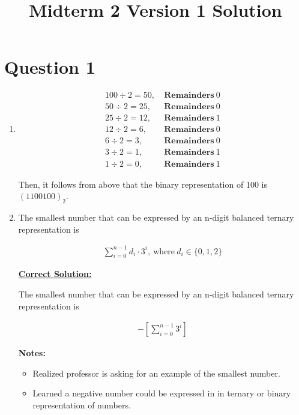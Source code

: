 \documentclass[12pt]{article}
\begin{document}
\title{Midterm 2 Version 1 Solution}
\maketitle

\section*{Question 1}
\begin{enumerate}
    \item

    \begin{align*}
        100 \div 2 = 50,\:&\textbf{Remainders}\:0\\
        50 \div 2 = 25,\:&\textbf{Remainders}\:0\\
        25 \div 2 = 12,\:&\textbf{Remainders}\:1\\
        12 \div 2 = 6,\:&\textbf{Remainders}\:0\\
        6 \div 2 = 3,\:&\textbf{Remainders}\:0\\
        3 \div 2 = 1,\:&\textbf{Remainders}\:1\\
        1 \div 2 = 0,\:&\textbf{Remainders}\:1
    \end{align*}

    \bigskip

    Then, it follows from above that the binary representation of 100 is $(1100100)_2$.

    \item

    The smallest number that can be expressed by an n-digit balanced ternary
    representation is

    \begin{align}
        \sum\limits_{i=0}^{n-1} d_i \cdot 3^i,\:\text{where}\:d_i \in \{0,1,2\}
    \end{align}

    \bigskip

    \begin{mdframed}
        \underline{\textbf{Correct Solution:}}

        \bigskip

        The smallest number that can be expressed by an n-digit balanced ternary
        representation is

        \begin{align}
            -\left[ \sum\limits_{i=0}^{n-1} 3^i \right]
        \end{align}
    \end{mdframed}

    \bigskip

    \textbf{Notes:}

    \begin{itemize}
        \item Realized professor is asking for an example of the smallest number.
        \item Learned a negative number could be expressed in in ternary or binary
        representation of numbers.
    \end{itemize}

\end{enumerate}
\end{document}
